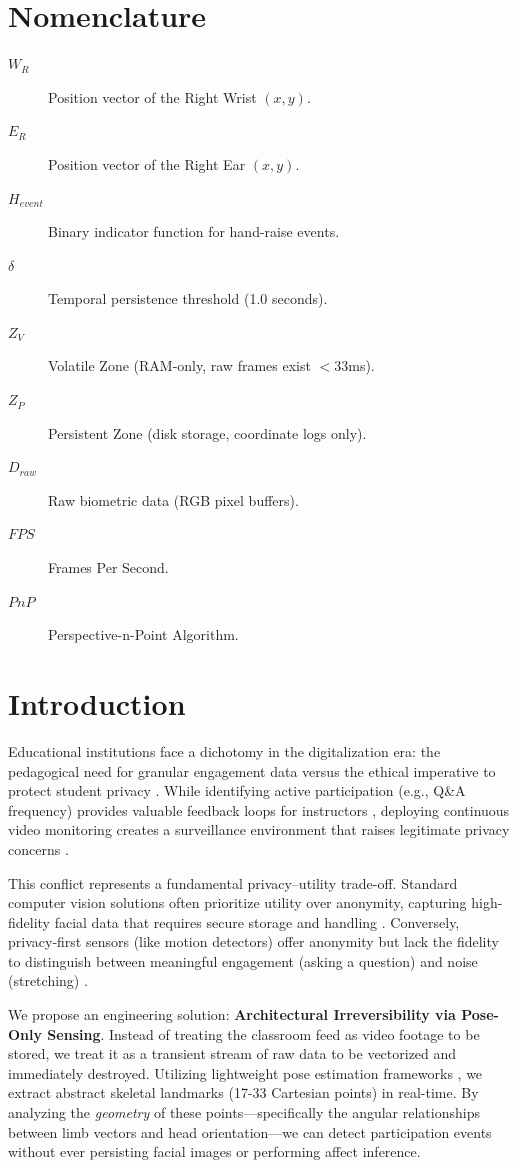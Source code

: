 \documentclass[conference]{IEEEtran}
\begin{document}
\section*{Nomenclature}
\begin{description}
    \item[$W_R$] Position vector of the Right Wrist $(x, y)$.
    \item[$E_R$] Position vector of the Right Ear $(x, y)$.
    \item[$H_{event}$] Binary indicator function for hand-raise events.
    \item[$\delta$] Temporal persistence threshold (1.0 seconds).
    \item[$Z_V$] Volatile Zone (RAM-only, raw frames exist $<$33ms).
    \item[$Z_P$] Persistent Zone (disk storage, coordinate logs only).
    \item[$D_{raw}$] Raw biometric data (RGB pixel buffers).
    \item[$FPS$] Frames Per Second.
    \item[$PnP$] Perspective-n-Point Algorithm.
\end{description}

\section{Introduction}
Educational institutions face a dichotomy in the digitalization era: the pedagogical need for granular engagement data versus the ethical imperative to protect student privacy \cite{b1}. While identifying active participation (e.g., Q\&A frequency) provides valuable feedback loops for instructors \cite{b18}, deploying continuous video monitoring creates a surveillance environment that raises legitimate privacy concerns \cite{b2, b17}.

This conflict represents a fundamental privacy--utility trade-off. Standard computer vision solutions often prioritize utility over anonymity, capturing high-fidelity facial data that requires secure storage and handling \cite{b4}. Conversely, privacy-first sensors (like motion detectors) offer anonymity but lack the fidelity to distinguish between meaningful engagement (asking a question) and noise (stretching) \cite{b5}.

We propose an engineering solution: \textbf{Architectural Irreversibility via Pose-Only Sensing}. Instead of treating the classroom feed as video footage to be stored, we treat it as a transient stream of raw data to be vectorized and immediately destroyed. Utilizing lightweight pose estimation frameworks \cite{b6, b10}, we extract abstract skeletal landmarks (17-33 Cartesian points) in real-time. By analyzing the \textit{geometry} of these points—specifically the angular relationships between limb vectors and head orientation—we can detect participation events without ever persisting facial images or performing affect inference.
\end{document}
